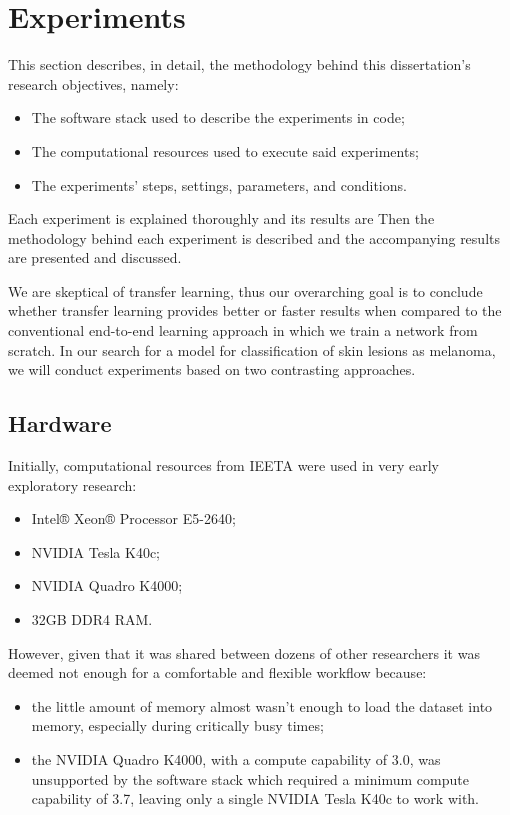 \chapter{Experiments}
\label{chapter:experiments}

This section describes, in detail, the methodology behind this dissertation's research objectives, namely:

\begin{itemize}
    \item The software stack used to describe the experiments in code;
    \item The computational resources used to execute said experiments;
    \item The experiments' steps, settings, parameters, and conditions.
\end{itemize}

Each experiment is explained thoroughly and its results are
Then the methodology behind each experiment is described and the accompanying results are presented and discussed.

We are skeptical of transfer learning, thus our overarching goal is to conclude whether transfer learning provides better or faster results when compared to the conventional end-to-end learning approach in which we train a network from scratch. In our search for a model for classification of skin lesions as melanoma, we will conduct experiments based on two contrasting approaches.

\section{Hardware}

Initially, computational resources from \ac{IEETA} were used in very early exploratory research:

\begin{itemize}
    \item Intel® Xeon® Processor E5-2640;
    \item NVIDIA Tesla K40c;
    \item NVIDIA Quadro K4000;
    \item 32GB DDR4 RAM.
\end{itemize}

However, given that it was shared between dozens of other researchers it was deemed not enough for a comfortable and flexible workflow because:

\begin{itemize}
    \item the little amount of memory almost wasn't enough to load the dataset into memory, especially during critically busy times;
    \item the NVIDIA Quadro K4000, with a compute capability of 3.0, was unsupported by the software stack which required a minimum compute capability of 3.7, leaving only a single NVIDIA Tesla K40c to work with.
\end{itemize}


